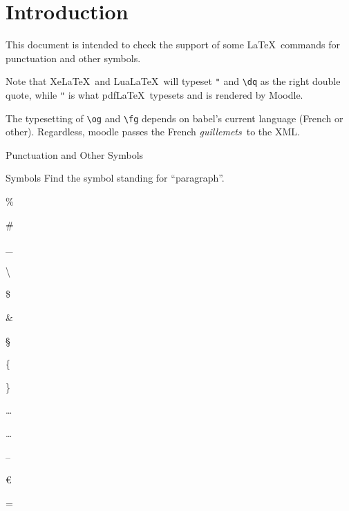 \documentclass{article}
\begin{document}
\section*{Introduction}

This document is intended to check the support of some \LaTeX\ commands for 
punctuation and other symbols.

Note that Xe\LaTeX\ and Lua\LaTeX\ will typeset \verb|"| and \verb|\dq| as the 
right double quote, while \verb|"| is what pdf\LaTeX\ typesets and is rendered 
by Moodle.

The typesetting of \verb|\og| and \verb|\fg| depends on 
\textsf{babel}'s current language (French or other). Regardless, 
\textsf{moodle} passes the French \og \emph{guillemets}\fg\ to the XML.

\begin{quiz}[points=1.0,shuffle=false]{Punctuation and Other Symbols}
\ifPDFTeX
  \NoAutoSpacing%
\fi
\begin{multi}{Symbols}
Find the symbol standing for ``paragraph''.
\item \%
\item \#
\item \_
\item \textbackslash
\item \$
\item \&
\item* \S
\item \{
\item \}
\item \texteuro
\item \dots
\item \ldots
\item \textexclamdown
\item \textquestiondown
\item --
\item \euro
\item =
\end{multi}


\end{quiz}
\end{document}
